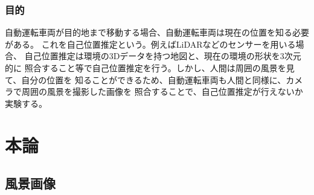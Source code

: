 \documentclass[titlepage,dvipdfmx]{jsarticle}
\begin{document}
\subsubsection{目的}
自動運転車両が目的地まで移動する場合、自動運転車両は現在の位置を知る必要がある。
これを自己位置推定という。例えばLiDARなどのセンサーを用いる場合、
自己位置推定は環境の3Dデータを持つ地図と、現在の環境の形状を3次元的に
照合すること等で自己位置推定を行う。しかし、人間は周囲の風景を見て、自分の位置を
知ることができるため、自動運転車両も人間と同様に、カメラで周囲の風景を撮影した画像を
照合することで、自己位置推定が行えないか実験する。
\section{本論}

\subsection{風景画像}
\end{document}
